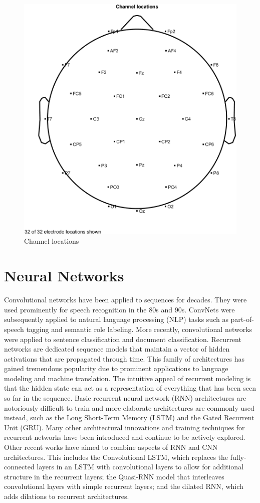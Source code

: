 \documentclass[12pt,a4paper,titlepage,openany]{report}
\begin{document}
\begin{figure}[H]
     \centering
     \includegraphics[width=0.7\linewidth]{./misc/Channel locations.png}
     \caption{Channel locations}
     \label{fig:channel-locations}
\end{figure}

\section{Neural Networks}

Convolutional networks have been applied to sequences for decades. They were used prominently for speech recognition in the 80s and 90s. 
ConvNets were subsequently applied to natural language processing (NLP) tasks such as part-of-speech tagging and semantic role labeling. 
More recently, convolutional networks were applied to sentence classification and document classification. 
Recurrent networks are dedicated sequence models that maintain a vector of hidden activations that are propagated through time. 
This family of architectures has gained tremendous popularity due to prominent applications to language modeling and machine translation. 
The intuitive appeal of recurrent modeling is that the hidden state can act as a representation of everything that has been seen so far in the sequence. 
Basic recurrent neural network (RNN) architectures are notoriously difficult to train and more elaborate architectures are commonly used instead, such as the Long Short-Term Memory (LSTM) and the Gated Recurrent Unit (GRU). 
Many other architectural innovations and training techniques for recurrent networks have been introduced and continue to be actively explored.
Other recent works have aimed to combine aspects of RNN and CNN architectures. This includes the Convolutional LSTM, which replaces the fully-connected layers in an LSTM with convolutional layers to allow for additional structure in the recurrent layers; the Quasi-RNN model that interleaves convolutional layers with simple recurrent layers; and the dilated RNN, which adds dilations to recurrent architectures.\\
\end{document}
